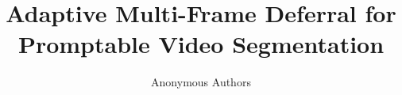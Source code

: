 \documentclass[10pt,twocolumn,letterpaper]{article}
\title{Adaptive Multi-Frame Deferral for Promptable Video Segmentation}
\author{Anonymous Authors}
\begin{document}
\maketitle









{\small


}

\end{document}
